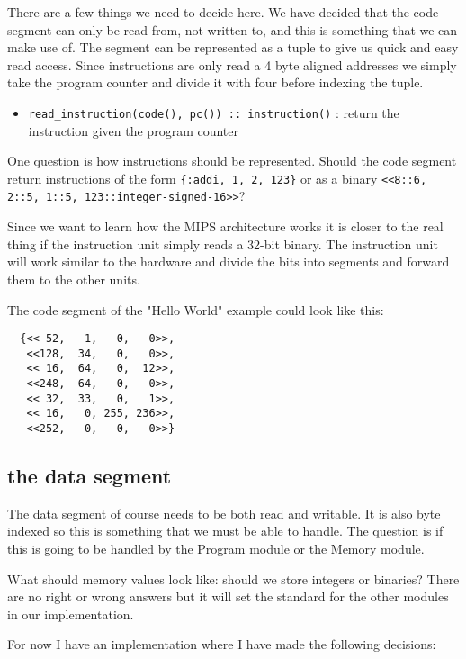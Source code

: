\documentclass[a4paper,11pt]{article}
\begin{document}
There are a few things we need to decide here. We have decided that
the code segment can only be read from, not written to, and this is
something that we can make use of. The segment can be represented as a
tuple to give us quick and easy read access. Since instructions are
only read a 4 byte aligned addresses we simply take the program
counter and divide it with four before indexing the tuple.

\begin{itemize}
\item {\tt read\_instruction(code(), pc()) :: instruction()} : return the  instruction given the program counter
\end{itemize}

One question is how instructions should be represented. Should the
code segment return instructions of the form {\tt \{:addi, 1, 2,
  123\}} or as a binary {\tt <<8::6, 2::5, 1::5,
  123::integer-signed-16>>}? 

Since we want to learn how the MIPS architecture works it is closer to
the real thing if the instruction unit simply reads a 32-bit
binary. The instruction unit will work similar to the hardware and
divide the bits into segments and forward them to the other units.

The code segment of the "Hello World" example could look like this:

\begin{verbatim}
  {<< 52,   1,   0,   0>>,
   <<128,  34,   0,   0>>,
   << 16,  64,   0,  12>>, 
   <<248,  64,   0,   0>>,
   << 32,  33,   0,   1>>, 
   << 16,   0, 255, 236>>, 
   <<252,   0,   0,   0>>}  
\end{verbatim}


\subsection*{the data segment}

The data segment of course needs to be both read and writable. It is
also byte indexed so this is something that we must be able to
handle. The question is if this is going to be handled by the Program
module or the Memory module.

What should memory values look like: should we store integers or binaries? 
There are no right or wrong answers but it will set the standard for
the other modules in our implementation. 

For now I have an implementation where I have made the following
decisions:
\end{document}
